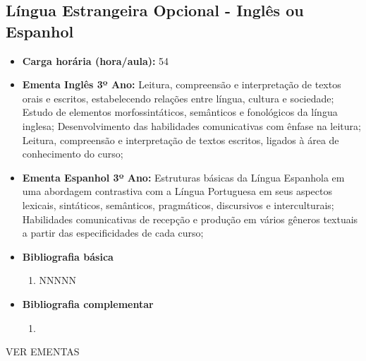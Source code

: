 \documentclass[11pt,fleqn]{book} %
\newcommand{\VER}[1]{\begingroup\color{red}#1\endgroup}
\begin{document}
\newpage
\subsection{Língua Estrangeira Opcional - Inglês ou Espanhol}\label{disc:ingles_espanhol}
\begin{itemize}
	\item \textbf{Carga horária (hora/aula):} 54
	\item \textbf{Ementa Inglês 3º Ano:} 
	Leitura, compreensão e interpretação de textos orais e escritos, estabelecendo relações entre língua, cultura e sociedade;
	Estudo de elementos morfossintáticos, semânticos e fonológicos da língua inglesa;
	Desenvolvimento das habilidades comunicativas com ênfase na leitura;
	Leitura, compreensão e interpretação de textos escritos, ligados à área de conhecimento do curso;
	\item \textbf{Ementa Espanhol 3º Ano:} 
	Estruturas básicas da Língua Espanhola em uma abordagem contrastiva com a Língua Portuguesa em seus aspectos lexicais, sintáticos, semânticos, pragmáticos, discursivos e interculturais; 
	Habilidades comunicativas de recepção e produção em vários gêneros textuais a partir das especificidades de cada curso;	
	\item \textbf{Bibliografia básica}
	\begin{enumerate}
		\item NNNNN
	\end{enumerate}
	\item \textbf{Bibliografia complementar}
	\begin{enumerate}
		\item 
	\end{enumerate}	
\end{itemize}
\VER{VER EMENTAS}


\newpage
\end{document}
